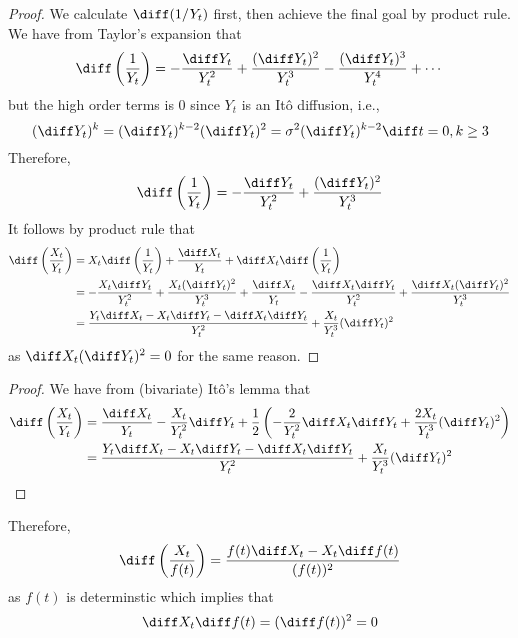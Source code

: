     \problem
    \begin{subproblem}[(\alph*)]
        \item
        \begin{proof}
            We calculate $\diff(1/Y_t)$ first, then achieve the final goal by
            product rule.
            We have from Taylor's expansion that
            \[\diff\left(\frac{1}{Y_t}\right)
            =-\frac{\diff Y_t}{Y_t^2}+\frac{(\diff Y_t)^2}{Y_t^3}
            -\frac{(\diff Y_t)^3}{Y_t^4}+\cdots\]
            but the high order terms is 0 since $Y_t$ is an It\^o diffusion, i.e.,
            \[(\diff Y_t)^k=(\diff Y_t)^{k-2}(\diff Y_t)^2=\sigma^2(\diff Y_t)^{k-2}\diff t=0
            ,k\geq 3\]
            Therefore,
            \[\diff\left(\frac{1}{Y_t}\right)
            =-\frac{\diff Y_t}{Y_t^2}+\frac{(\diff Y_t)^2}{Y_t^3}\]
            It follows by product rule that
            \[\begin{aligned}
                \diff\left(\frac{X_t}{Y_t}\right)
                &=X_t\diff\left(\frac{1}{Y_t}\right)+\frac{\diff X_t}{Y_t}
                +\diff X_t\diff\left(\frac{1}{Y_t}\right)\\
                &=-\frac{X_t\diff Y_t}{Y_t^2}+\frac{X_t(\diff Y_t)^2}{Y_t^3}
                +\frac{\diff X_t}{Y_t}
                -\frac{\diff X_t\diff Y_t}{Y_t^2}
                +\frac{\diff X_t(\diff Y_t)^2}{Y_t^3}\\
                &=\frac{Y_t\diff X_t-X_t\diff Y_t-\diff X_t\diff Y_t}%
                  {Y_t^2}+\frac{X_t}{Y_t^3}(\diff Y_t)^2
            \end{aligned}\]
            as $\diff X_t(\diff Y_t)^2=0$ for the same reason.
        \end{proof}

        \item
        \begin{proof}
            We have from (bivariate) It\^o's lemma that
            \[\begin{aligned}
                \diff\left(\frac{X_t}{Y_t}\right)&=
                \frac{\diff X_t}{Y_t}-\frac{X_t}{Y_t^2}\diff Y_t
                +\frac{1}{2}\left(
                    -\frac{2}{Y_t^2}\diff X_t\diff Y_t
                    +\frac{2X_t}{Y_t^3}(\diff Y_t)^2
                \right)\\
                &=\frac{Y_t\diff X_t-X_t\diff Y_t-\diff X_t\diff Y_t}%
                  {Y_t^2}+\frac{X_t}{Y_t^3}(\diff Y_t)^2
            \end{aligned}\]
        \end{proof}

        Therefore,
        \[\diff\left(\frac{X_t}{f(t)}\right)
        =\frac{f(t)\diff X_t-X_t\diff f(t)}{(f(t))^2}\]
        as $f(t)$ is determinstic which implies that
        \[\diff X_t\diff f(t)=(\diff f(t))^2=0\]
    \end{subproblem}


